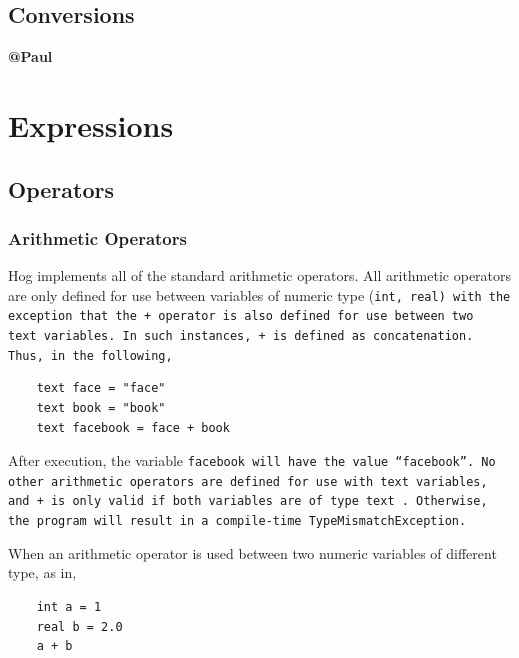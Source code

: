 \documentclass{article}
\begin{document}

\subsection{Conversions} %
\label{sub:conversions}

\textbf{@Paul}



\section{Expressions} %
\label{sec:expressions}

\subsection{Operators} %
\label{sub:operators}

\subsubsection{Arithmetic Operators} %
\label{ssub:arithmetic_operators}

Hog implements all of the standard arithmetic operators. All arithmetic operators are only defined for use between variables of
numeric type (\tt int\rm, \tt real\rm) with the exception that the \tt + \rm operator is also defined for use between two \tt
text \rm variables. In such instances, \tt + \rm is defined as concatenation. Thus, in the following,

\begin{verbatim}
    text face = "face"
    text book = "book"
    text facebook = face + book
\end{verbatim}

After execution, the variable \tt facebook \rm will have the value ``facebook''. No other arithmetic operators are defined for
use with \tt text \rm variables, and \tt + \rm is only valid if both variables are of type \tt text \rm. Otherwise, the program
will result in a compile-time \tt TypeMismatchException\rm. 

When an arithmetic operator is used between two numeric variables of different type, as in,

\begin{verbatim}
    int a = 1
    real b = 2.0
    a + b
\end{verbatim}
\end{document}
